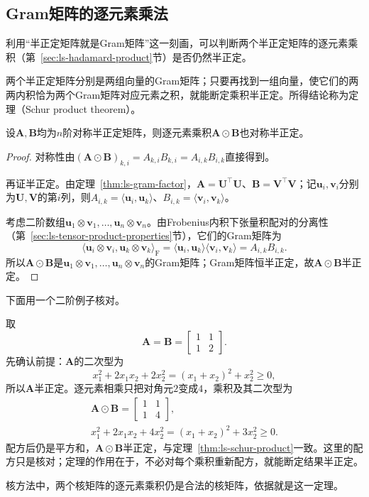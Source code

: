 \subsection{Gram矩阵的逐元素乘法}
\label{sec:ls-schur-product}
利用“半正定矩阵就是Gram矩阵”这一刻画，可以判断两个半正定矩阵的逐元素乘积（第~\ref{sec:ls-hadamard-product}节）是否仍然半正定。

两个半正定矩阵分别是两组向量的Gram矩阵；只要再找到一组向量，使它们的两两内积恰为两个Gram矩阵对应元素之积，就能断定乘积半正定。所得结论称为定理（Schur product theorem）。
\begin{theorem}[Schur乘积定理]
\label{thm:ls-schur-product}
设$\bm A,\bm B$均为$n$阶对称半正定矩阵，则逐元素乘积$\bm A\odot\bm B$也对称半正定。
\end{theorem}
\begin{proof}
对称性由$(\bm A\odot\bm B)_{k,i}=A_{k,i}B_{k,i}=A_{i,k}B_{i,k}$直接得到。

再证半正定。由定理~\ref{thm:ls-gram-factor}，$\bm A=\bm U^\top\bm U$、$\bm B=\bm V^\top\bm V$；记$\bm u_i,\bm v_i$分别为$\bm U,\bm V$的第$i$列，则$A_{i,k}=\langle\bm u_i,\bm u_k\rangle$、$B_{i,k}=\langle\bm v_i,\bm v_k\rangle$。

考虑二阶数组$\bm u_1\otimes\bm v_1,\ldots,\bm u_n\otimes\bm v_n$。由Frobenius内积下张量积配对的分离性（第~\ref{sec:ls-tensor-product-properties}节），它们的Gram矩阵为
\[
 \langle\bm u_i\otimes\bm v_i,\bm u_k\otimes\bm v_k\rangle_{\mathrm F}
 =\langle\bm u_i,\bm u_k\rangle\langle\bm v_i,\bm v_k\rangle
 =A_{i,k}B_{i,k}.
\]
所以$\bm A\odot\bm B$是$\bm u_1\otimes\bm v_1,\ldots,\bm u_n\otimes\bm v_n$的Gram矩阵；Gram矩阵恒半正定，故$\bm A\odot\bm B$半正定。
\end{proof}
下面用一个二阶例子核对。
\begin{example}[两个半正定矩阵的逐元素乘积]
\label{ex:ls-schur-product}
取
\[
 \bm A=\bm B=\begin{bmatrix}1&1\\1&2\end{bmatrix}.
\]
先确认前提：$\bm A$的二次型为
\[
 x_1^2+2x_1x_2+2x_2^2=(x_1+x_2)^2+x_2^2\geq0,
\]
所以$\bm A$半正定。逐元素相乘只把对角元$2$变成$4$，乘积及其二次型为
\[
\begin{gathered}
\bm A\odot\bm B=\begin{bmatrix}1&1\\1&4\end{bmatrix},\\
x_1^2+2x_1x_2+4x_2^2=(x_1+x_2)^2+3x_2^2\geq0 .
\end{gathered}
\]
配方后仍是平方和，$\bm A\odot\bm B$半正定，与定理~\ref{thm:ls-schur-product}一致。这里的配方只是核对；定理的作用在于，不必对每个乘积重新配方，就能断定结果半正定。
\end{example}
核方法中，两个核矩阵的逐元素乘积仍是合法的核矩阵，依据就是这一定理。

